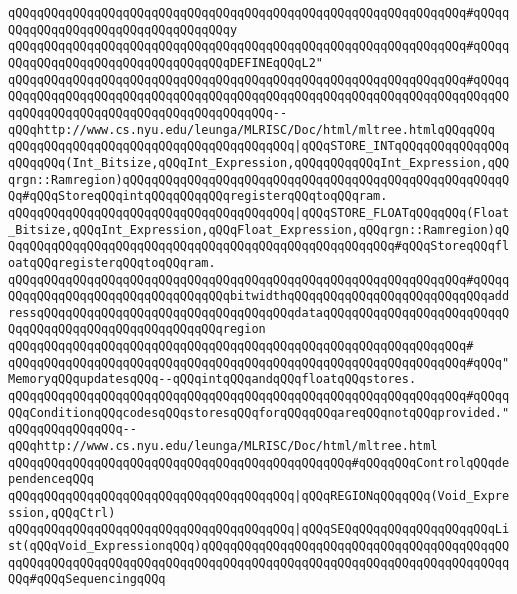 \verb|qQQqqQQqqQQqqQQqqQQqqQQqqQQqqQQqqQQqqQQqqQQqqQQqqQQqqQQqqQQqqQQq#qQQqqQQqqQQqqQQqqQQqqQQqqQQqqQQqqQQqy|\newline
\verb|qQQqqQQqqQQqqQQqqQQqqQQqqQQqqQQqqQQqqQQqqQQqqQQqqQQqqQQqqQQqqQQq#qQQqqQQqqQQqqQQqqQQqqQQqqQQqqQQqqQQqDEFINEqQQqL2"|\newline
\verb|qQQqqQQqqQQqqQQqqQQqqQQqqQQqqQQqqQQqqQQqqQQqqQQqqQQqqQQqqQQqqQQq#qQQqqQQqqQQqqQQqqQQqqQQqqQQqqQQqqQQqqQQqqQQqqQQqqQQqqQQqqQQqqQQqqQQqqQQqqQQqqQQqqQQqqQQqqQQqqQQqqQQqqQQqqQQqqQQq--qQQqhttp://www.cs.nyu.edu/leunga/MLRISC/Doc/html/mltree.htmlqQQqqQQq|\newline
\newline
\verb|qQQqqQQqqQQqqQQqqQQqqQQqqQQqqQQqqQQqqQQq|\verb#|qQQqSTORE_INTqQQqqQQqqQQqqQQqqQQqqQQq(Int_Bitsize,qQQqInt_Expression,qQQqqQQqqQQqInt_Expression,qQQqrgn::Ramregion)qQQqqQQqqQQqqQQqqQQqqQQqqQQqqQQqqQQqqQQqqQQqqQQqqQQqqQQq#\verb|#qQQqStoreqQQqintqQQqqQQqqQQqregisterqQQqtoqQQqram.|\newline
\verb|qQQqqQQqqQQqqQQqqQQqqQQqqQQqqQQqqQQqqQQq|\verb#|qQQqSTORE_FLOATqQQqqQQq(Float_Bitsize,qQQqInt_Expression,qQQqFloat_Expression,qQQqrgn::Ramregion)qQQqqQQqqQQqqQQqqQQqqQQqqQQqqQQqqQQqqQQqqQQqqQQqqQQqqQQq#\verb|#qQQqStoreqQQqfloatqQQqregisterqQQqtoqQQqram.|\newline
\verb|qQQqqQQqqQQqqQQqqQQqqQQqqQQqqQQqqQQqqQQqqQQqqQQqqQQqqQQqqQQqqQQq#qQQqqQQqqQQqqQQqqQQqqQQqqQQqqQQqqQQqbitwidthqQQqqQQqqQQqqQQqqQQqqQQqqQQqaddressqQQqqQQqqQQqqQQqqQQqqQQqqQQqqQQqqQQqdataqQQqqQQqqQQqqQQqqQQqqQQqqQQqqQQqqQQqqQQqqQQqqQQqqQQqqQQqregion|\newline
\verb|qQQqqQQqqQQqqQQqqQQqqQQqqQQqqQQqqQQqqQQqqQQqqQQqqQQqqQQqqQQqqQQq#|\newline
\verb|qQQqqQQqqQQqqQQqqQQqqQQqqQQqqQQqqQQqqQQqqQQqqQQqqQQqqQQqqQQqqQQq#qQQq"MemoryqQQqupdatesqQQq--qQQqintqQQqandqQQqfloatqQQqstores.|\newline
\verb|qQQqqQQqqQQqqQQqqQQqqQQqqQQqqQQqqQQqqQQqqQQqqQQqqQQqqQQqqQQqqQQq#qQQqqQQqConditionqQQqcodesqQQqstoresqQQqforqQQqqQQqareqQQqnotqQQqprovided."qQQqqQQqqQQqqQQq--qQQqhttp://www.cs.nyu.edu/leunga/MLRISC/Doc/html/mltree.html|\newline
\newline
\verb|qQQqqQQqqQQqqQQqqQQqqQQqqQQqqQQqqQQqqQQqqQQqqQQq#qQQqqQQqControlqQQqdependenceqQQq|\newline
\verb|qQQqqQQqqQQqqQQqqQQqqQQqqQQqqQQqqQQqqQQq|\verb#|qQQqREGIONqQQqqQQq(Void_Expression,qQQqCtrl)#\newline
\newline
\verb|qQQqqQQqqQQqqQQqqQQqqQQqqQQqqQQqqQQqqQQq|\verb#|qQQqSEQqQQqqQQqqQQqqQQqqQQqList(qQQqVoid_ExpressionqQQq)qQQqqQQqqQQqqQQqqQQqqQQqqQQqqQQqqQQqqQQqqQQqqQQqqQQqqQQqqQQqqQQqqQQqqQQqqQQqqQQqqQQqqQQqqQQqqQQqqQQqqQQqqQQqqQQqqQQq#\verb|#qQQqSequencingqQQq|\newline
